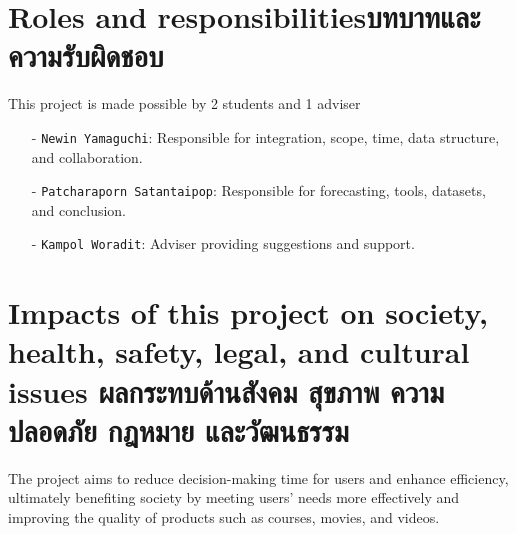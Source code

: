 \section{\ifenglish Roles and responsibilities\else บทบาทและความรับผิดชอบ\fi}
This project is made possible by 2 students and 1 adviser

\begin{itemize}
    \item[-] \texttt{Newin Yamaguchi}\textsf{: Responsible for integration, scope, time, data structure, and collaboration.}
    \item[-] \texttt{Patcharaporn Satantaipop}\textsf{: Responsible for forecasting, tools, datasets, and conclusion.}
    \item[-] \texttt{Kampol Woradit}\textsf{: Adviser providing suggestions and support.}
\end{itemize}

\section{\ifenglish%
Impacts of this project on society, health, safety, legal, and cultural issues
\else%
ผลกระทบด้านสังคม สุขภาพ ความปลอดภัย กฎหมาย และวัฒนธรรม
\fi}

The project aims to reduce decision-making time for users and enhance efficiency, 
ultimately benefiting society by meeting users' needs more effectively and improving 
the quality of products such as courses, movies, and videos.